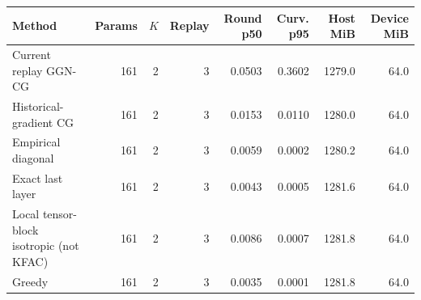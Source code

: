 \begin{tabular}{lrrrrrrr}
\toprule
Method & Params & $K$ & Replay & Round p50 & Curv. p95 & Host MiB & Device MiB \\
\midrule
Current replay GGN-CG & 161 & 2 & 3 & 0.0503 & 0.3602 & 1279.0 & 64.0 \\
Historical-gradient CG & 161 & 2 & 3 & 0.0153 & 0.0110 & 1280.0 & 64.0 \\
Empirical diagonal & 161 & 2 & 3 & 0.0059 & 0.0002 & 1280.2 & 64.0 \\
Exact last layer & 161 & 2 & 3 & 0.0043 & 0.0005 & 1281.6 & 64.0 \\
Local tensor-block isotropic (not KFAC) & 161 & 2 & 3 & 0.0086 & 0.0007 & 1281.8 & 64.0 \\
Greedy & 161 & 2 & 3 & 0.0035 & 0.0001 & 1281.8 & 64.0 \\
\bottomrule
\end{tabular}
